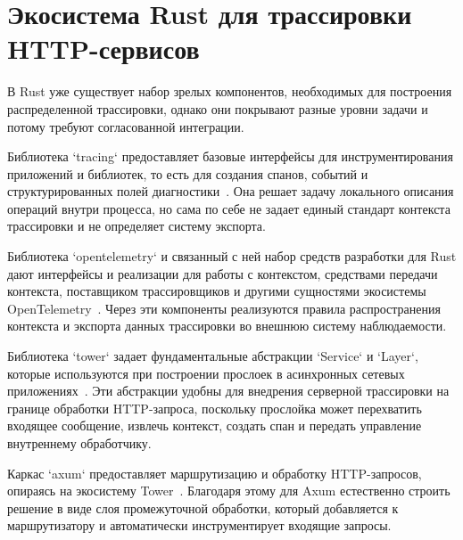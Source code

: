 \section{Экосистема Rust для трассировки HTTP-сервисов}

В Rust уже существует набор зрелых компонентов, необходимых для построения
распределенной трассировки, однако они покрывают разные уровни задачи и потому
требуют согласованной интеграции.

Библиотека `tracing` предоставляет базовые интерфейсы для инструментирования
приложений и библиотек, то есть для создания спанов, событий и структурированных
полей диагностики~\cite{tracingDocs,tracingSubscriberDocs}. Она решает задачу
локального описания операций внутри процесса, но сама по себе не задает единый
стандарт контекста трассировки и не определяет систему экспорта.

Библиотека `opentelemetry` и связанный с ней набор средств разработки для Rust дают
интерфейсы и реализации для работы с контекстом, средствами передачи контекста,
поставщиком трассировщиков и другими сущностями экосистемы OpenTelemetry~\cite{opentelemetryPropagationDocs,opentelemetrySdkTraceDocs}.
Через эти компоненты реализуются правила распространения контекста и экспорта
данных трассировки во внешнюю систему наблюдаемости.

Библиотека `tower` задает фундаментальные абстракции `Service` и `Layer`, которые
используются при построении прослоек в асинхронных сетевых приложениях~\cite{towerDocs,towerServiceDocs,towerLayerDocs}.
Эти абстракции удобны для внедрения серверной трассировки на границе обработки
HTTP-запроса, поскольку прослойка может перехватить входящее сообщение, извлечь
контекст, создать спан и передать управление внутреннему обработчику.

Каркас `axum` предоставляет маршрутизацию и обработку HTTP-запросов, опираясь на
экосистему Tower~\cite{axumDocs}. Благодаря этому для Axum естественно строить
решение в виде слоя промежуточной обработки, который добавляется к маршрутизатору
и автоматически инструментирует входящие запросы.


